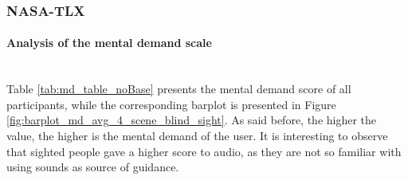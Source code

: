 \subsubsection{NASA-TLX}
\label{subsubsec:results_nasa_tlx_2}

\paragraph{Analysis of the mental demand scale}\mbox{}\\

Table \ref{tab:md_table_noBase} presents the mental demand score of all participants, while the corresponding barplot is presented in Figure \ref{fig:barplot_md_avg_4_scene_blind_sight}. As said before, the higher the value, the higher is the mental demand of the user. It is interesting to observe that sighted people gave a higher score to audio, as they are not so familiar with using sounds as source of guidance.




